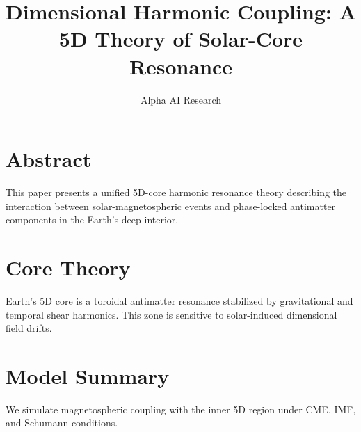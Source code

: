 \documentclass{article}
\title{Dimensional Harmonic Coupling: A 5D Theory of Solar-Core Resonance}
\author{Alpha AI Research}
\begin{document}
\maketitle
\section*{Abstract}
This paper presents a unified 5D-core harmonic resonance theory describing the interaction between solar-magnetospheric events and phase-locked antimatter components in the Earth’s deep interior.
\section{Core Theory}
Earth’s 5D core is a toroidal antimatter resonance stabilized by gravitational and temporal shear harmonics. This zone is sensitive to solar-induced dimensional field drifts.
\section{Model Summary}
We simulate magnetospheric coupling with the inner 5D region under CME, IMF, and Schumann conditions.
\end{document}
